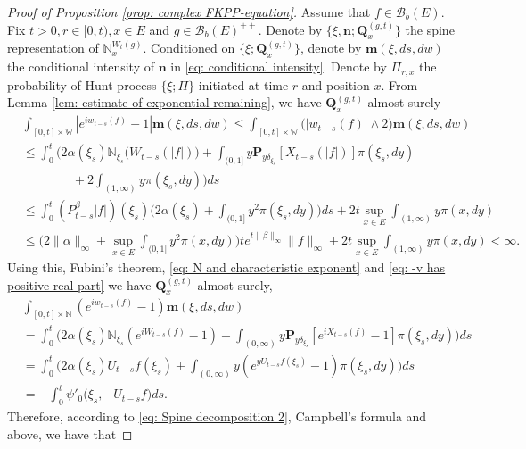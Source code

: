 \documentclass[12pt]{amsart}
\theoremstyle{plain}
\theoremstyle{definition}
\numberwithin{equation}{section}
\begin{document}
\begin{proof}[Proof of Proposition \ref{prop: complex FKPP-equation}]
    Assume that $f\in \mathcal B_b(E)$.
    Fix $t>0, r\in [0,t), x\in E$ and $g\in \mathcal B_b(E)^{++}$.
    Denote by $\{\xi, \mathbf n; \mathbf Q_x^{(g,t)}\}$ the spine representation of $\mathbb N_x^{W_t(g)}$.
    Conditioned on $\{\xi; \mathbf Q_x^{(g,t)}\}$, denote by $\mathbf m(\xi, ds,dw)$ the conditional intensity of $\mathbf n$ in \eqref{eq: conditional intensity}.
    Denote by $\Pi_{r,x}$ the probability of Hunt process $\{\xi; \Pi\}$ initiated at time $r$ and position $x$.
    From Lemma \ref{lem: estimate of exponential remaining}, we have $\mathbf Q^{(g,t)}_{x}$-almost surely
\begin{align}
&\int_{[0,t]\times \mathbb W}|e^{i w_{t-s}(f)} - 1| \mathbf m(\xi, ds,dw)
    \leq \int_{[0,t]\times \mathbb W}\big(| w_{t-s}(f)| \wedge 2\big) \mathbf m(\xi, ds,dw)
    \\&\leq \int_0^t \Big(2\alpha(\xi_s)\mathbb N_{\xi_s}\big( W_{t-s}(|f|)\big)  + \int_{(0,1]} y \mathbf P_{y \delta_{\xi_s}}[ X_{t-s}(|f|)] \pi(\xi_s,dy)
    \\&\qquad\qquad+ 2\int_{(1,\infty)}y\pi(\xi_s,dy)\Big) ds
     \\&\leq \int_0^t (P_{t-s}^\beta |f|)(\xi_s)\Big(2\alpha(\xi_s)  + \int_{(0,1]} y^2 \pi(\xi_s,dy)\Big) ds + 2t \sup_{x\in E}\int_{(1,\infty)}y\pi(x,dy)
    \\&\leq \Big(2\|\alpha\|_\infty +\sup_{x\in E}\int_{(0,1]} y^2 \pi(x,dy)\Big) t e^{t\|\beta\|_\infty}\|f\|_\infty + 2t \sup_{x\in E}\int_{(1,\infty)}y\pi(x,dy)
    < \infty.
\end{align}
    Using this, Fubini's theorem, \eqref{eq: N and characteristic exponent} and \eqref{eq: -v has positive real part} we have $\mathbf Q^{(g,t)}_{x}$-almost surely,
\begin{align}
    &\int_{[0,t]\times \mathbb N}(e^{i w_{t-s}(f)} - 1) \mathbf m(\xi, ds,dw)
    \\&=\int_0^t \Big(2\alpha(\xi_s)\mathbb N_{\xi_s}(e^{i W_{t-s}(f)} - 1)  + \int_{(0,\infty)} y \mathbf P_{y \delta_{\xi_s}}[e^{i X_{t-s}(f)} - 1] \pi(\xi_s,dy)\Big) ds
    \\&=\int_0^t \Big( 2\alpha(\xi_s) U_{t-s} f(\xi_s) + \int_{(0,\infty)} y (e^{y U_{t-s}f(\xi_s)} - 1) \pi(\xi_s,dy) \Big) ds
    \\&= -\int_0^t \psi'_0 \big(\xi_s, -U_{t-s}f\big)ds.
\end{align}
    Therefore, according to \eqref{eq: Spine decomposition 2}, Campbell's formula and above, we have that

\end{proof}
\end{document}
